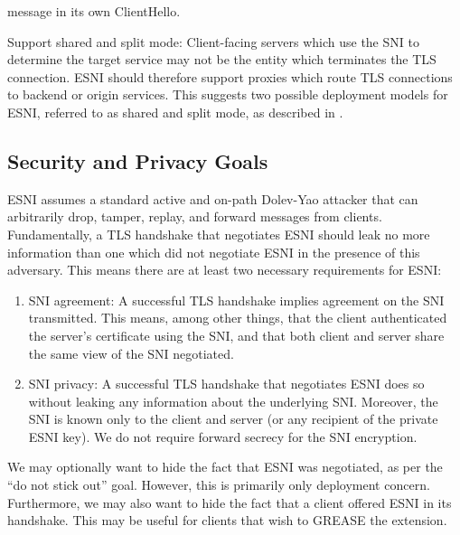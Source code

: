 \documentclass{article}
\theoremstyle{definition}
\theoremstyle{definition}
\begin{document}
\begin{compactitem}
  message in its own ClientHello.
  \item Support shared and split mode: Client-facing servers which use the SNI to determine 
  the target service may not be the entity which terminates the TLS connection. ESNI should therefore
  support proxies which route TLS connections to backend or origin services. This suggests two
  possible deployment models for ESNI, referred to as shared and split mode, as described in
  \cite{ietf-tls-esni-04}.
\end{compactitem}
%

\subsection{Security and Privacy Goals} \label{sec:security}
ESNI assumes a standard active and on-path Dolev-Yao attacker that can arbitrarily drop, tamper, 
replay, and forward messages from clients. Fundamentally, a TLS handshake that negotiates ESNI should 
leak no more information than one which did not negotiate ESNI in the presence of this adversary. 
This means there are at least two necessary requirements for ESNI:
%
\begin{enumerate}
  \item SNI agreement: A successful TLS handshake implies agreement on the SNI transmitted. This means, among 
  other things, that the client authenticated the server's certificate using the SNI, and that both client and 
  server share the same view of the SNI negotiated.
  \item SNI privacy: A successful TLS handshake that negotiates ESNI does so without leaking any information 
  about the underlying SNI. Moreover, the SNI is known only to the client and server (or any recipient of the
  private ESNI key). We do not require forward secrecy for the SNI encryption.
\end{enumerate}
%
We may optionally want to hide the fact that ESNI was negotiated, as per the ``do not stick out'' goal. However, 
this is primarily only deployment concern. Furthermore, we may also want to hide the fact that a client offered
ESNI in its handshake. This may be useful for clients that wish to GREASE \cite{ietf-tls-grease-04} the extension.
\end{document}
